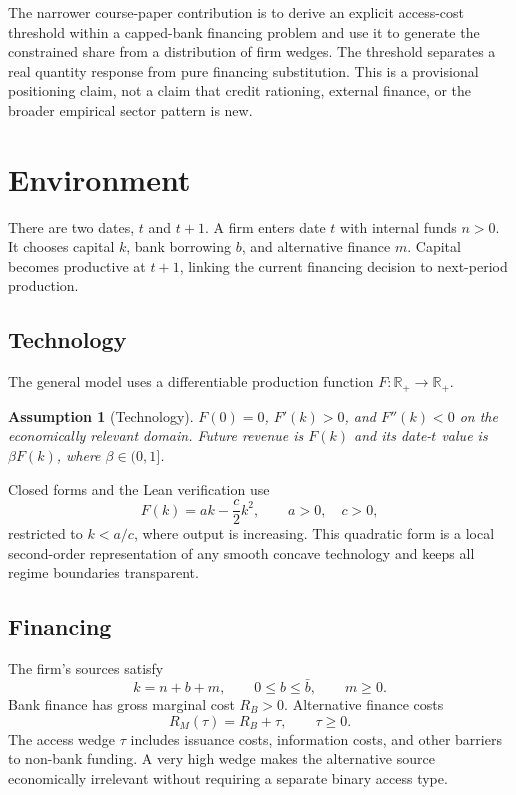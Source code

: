\documentclass[11pt]{article}
\newtheorem{assumption}{Assumption}
\theoremstyle{definition}
\theoremstyle{remark}
\newcommand{\R}{\mathbb{R}}
\newcommand{\Rb}{R_B}
\newcommand{\Rm}{R_M}
\begin{document}
The narrower course-paper contribution is to derive an explicit access-cost
threshold within a capped-bank financing problem and use it to generate the
constrained share from a distribution of firm wedges. The threshold separates
a real quantity response from pure financing substitution. This is a
provisional positioning claim, not a claim that credit rationing, external
finance, or the broader empirical sector pattern is new.

\section{Environment}

There are two dates, $t$ and $t+1$. A firm enters date $t$ with internal funds
$n>0$. It chooses capital $k$, bank borrowing $b$, and alternative finance $m$.
Capital becomes productive at $t+1$, linking the current financing decision to
next-period production.

\subsection{Technology}

The general model uses a differentiable production function $F:\R_+\to\R_+$.

\begin{assumption}[Technology]\label{ass:technology}
$F(0)=0$, $F'(k)>0$, and $F''(k)<0$ on the economically relevant domain.
Future revenue is $F(k)$ and its date-$t$ value is $\beta F(k)$, where
$\beta\in(0,1]$.
\end{assumption}

Closed forms and the Lean verification use
\begin{equation}\label{eq:quadratic}
F(k)=ak-\frac{c}{2}k^2,\qquad a>0,\quad c>0,
\end{equation}
restricted to $k<a/c$, where output is increasing. This quadratic form is a
local second-order representation of any smooth concave technology and keeps
all regime boundaries transparent.

\subsection{Financing}

The firm's sources satisfy
\begin{equation}\label{eq:financeidentity}
k=n+b+m,\qquad 0\le b\le \bar b,\qquad m\ge 0.
\end{equation}
Bank finance has gross marginal cost $\Rb>0$. Alternative finance costs
\begin{equation}
\Rm(\tau)=\Rb+\tau,\qquad \tau\ge 0.
\end{equation}
The access wedge $\tau$ includes issuance costs, information costs, and other
barriers to non-bank funding. A very high wedge makes the alternative source
economically irrelevant without requiring a separate binary access type.
\end{document}

